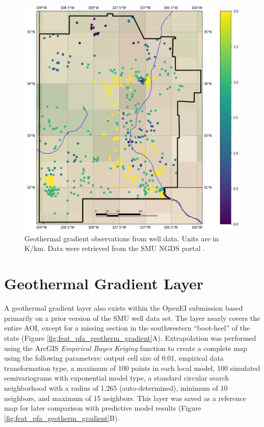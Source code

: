 \begin{figure}[H]
\centering
\includegraphics[width=0.8\linewidth]{templates/images/GeothermGrad_input_wells_map-4classes_grid.png}
\caption[Geothermal gradient well data]{Geothermal gradient observations from well data. Units are in K/km. Data were retrieved from the SMU NGDS portal \protect\citep{smu_geothermal_2021}.}
\label{fig:feat_geotherm_gradient}
\end{figure}
\pagebreak

\section{Geothermal Gradient Layer}\label{app:dl_geothermal_gradient}
A geothermal gradient layer also exists within the \citeauthor{bielicki_hydrogeolgic_2015} OpenEI submission \citep{kelley_geothermal_2015} based primarily on a prior version of the SMU well data set. The layer nearly covers the entire AOI, except for a missing section in the southwestern ``boot-heel'' of the state (Figure \ref{fig:feat_pfa_geotherm_gradient}A). Extrapolation was performed using the ArcGIS \textit{Empirical Bayes Kriging} function to create a complete map using the following parameters: output cell size of 0.01, empirical data transformation type, a maximum of 100 points in each local model, 100 simulated semivariograms with exponential model type, a standard circular search neighborhood with a radius of 1.265 (auto-determined), minimum of 10 neighbors, and maximum of 15 neighbors. This layer was saved as a reference map for later comparison with predictive model results (Figure \ref{fig:feat_pfa_geotherm_gradient}B).  

